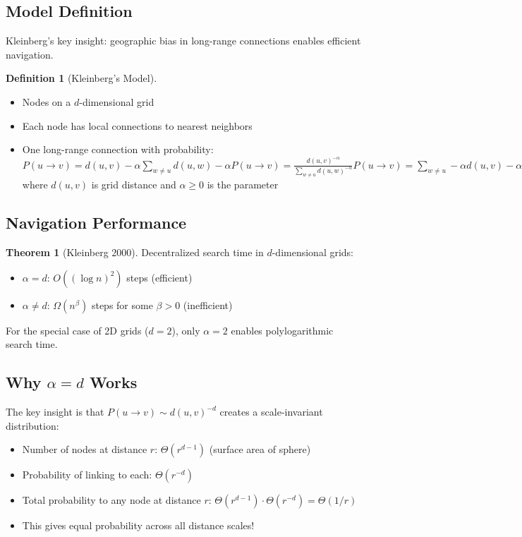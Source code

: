 \documentclass[11pt,a4paper]{article}
\theoremstyle{definition}
\newtheorem{definition}{Definition}
\newtheorem{theorem}{Theorem}
\begin{document}
\subsection{Model Definition}
Kleinberg's key insight: geographic bias in long-range connections enables efficient navigation.
\begin{definition}[Kleinberg's Model]
\begin{itemize}
\item Nodes on a $d$-dimensional grid
\item Each node has local connections to nearest neighbors
\item One long-range connection with probability:
$P(u\rightarrow v)=d(u,v)−\alpha\sum_{w\neq u}d(u,w)−\alpha P(u \rightarrow v) = \frac{d(u,v)^{-\alpha}}{\sum_{w \neq u} d(u,w)^{-\alpha}}P(u\rightarrow v)=\sum_{w\neq u}-\alpha d(u,v)−\alpha$
where $d(u,v)$ is grid distance and $\alpha \geq 0$ is the parameter
\end{itemize}
\end{definition}
\subsection{Navigation Performance}
\begin{theorem}[Kleinberg 2000]
Decentralized search time in $d$-dimensional grids:
\begin{itemize}
\item $\alpha = d$: $O((\log n)^2)$ steps (efficient)
\item $\alpha \neq d$: $\Omega(n^{\beta})$ steps for some $\beta > 0$ (inefficient)
\end{itemize}
\end{theorem}
For the special case of 2D grids ($d=2$), only $\alpha = 2$ enables polylogarithmic search time.
\subsection{Why $\alpha = d$ Works}
The key insight is that $P(u \rightarrow v) \sim d(u,v)^{-d}$ creates a scale-invariant distribution:
\begin{itemize}
\item Number of nodes at distance $r$: $\Theta(r^{d-1})$ (surface area of sphere)
\item Probability of linking to each: $\Theta(r^{-d})$
\item Total probability to any node at distance $r$: $\Theta(r^{d-1}) \cdot \Theta(r^{-d}) = \Theta(1/r)$
\item This gives equal probability across all distance scales!
\end{itemize}
\end{document}
